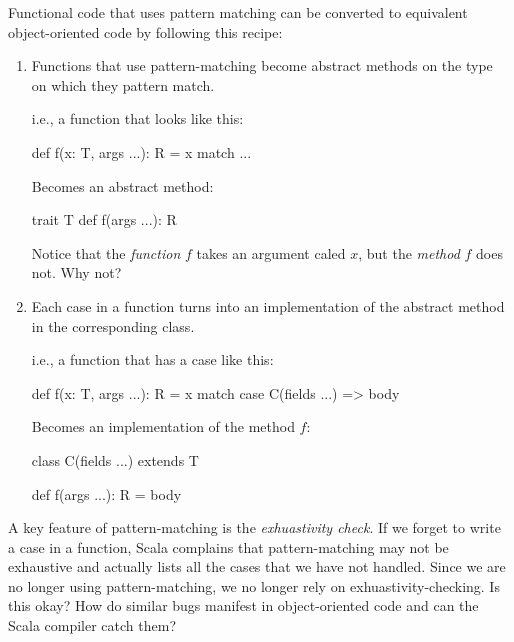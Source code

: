 \documentclass{book}
\begin{document}
Functional code that uses pattern matching can be converted to equivalent
object-oriented code by following this recipe:

\begin{enumerate}

  \item Functions that use pattern-matching become abstract methods on the type
  on which they pattern match.

  i.e., a function that looks like this:

  \begin{scalacode}
  def f(x: T, args ...): R = x match { ... }
  \end{scalacode}

  Becomes an abstract method:

  \begin{scalacode}
  trait T {
    def f(args ...): R
  }
  \end{scalacode}

  \begin{think}
  Notice that the \emph{function} $f$ takes an argument caled $x$, but
  the \emph{method} $f$ does not. Why not?
  \end{think}

  \item Each case in a function turns into an implementation of the abstract
  method in the corresponding class.

  i.e., a function that has a case like this:

  \begin{scalacode}
  def f(x: T, args ...): R = x match {
    case C(fields ...) => body
  }
  \end{scalacode}

  Becomes an implementation of the method $f$:

  \begin{scalacode}
  class C(fields ...) extends T {

    def f(args ...): R = body
  }
  \end{scalacode}

\end{enumerate}

\begin{think}
A key feature of pattern-matching is the \emph{exhuastivity check}. If
we forget to write a case in a function, Scala complains that pattern-matching
may not be exhaustive and actually lists all the cases that we have not
handled. Since we are no longer using pattern-matching, we no longer rely
on exhuastivity-checking. Is this okay? How do similar bugs manifest in
object-oriented code and can the Scala compiler catch them?
\end{think}
\end{document}
